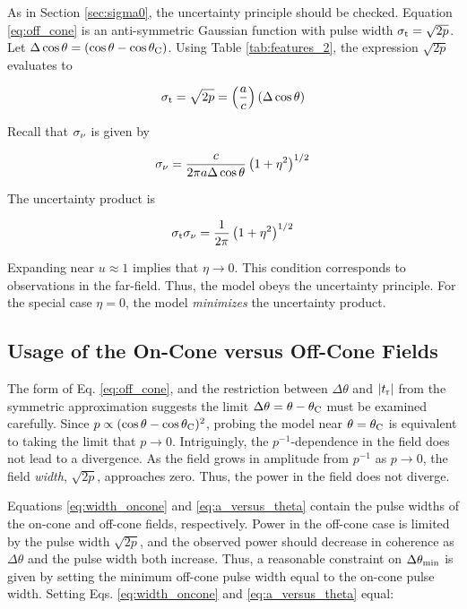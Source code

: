 \documentclass[amsmath,amssymb,aps,prd,10pt,twocolumn]{revtex4}
\begin{document}
As in Section \ref{sec:sigma0}, the uncertainty principle should be checked.  Equation \ref{eq:off_cone} is an anti-symmetric Gaussian function with pulse width $\sigma_{\rm t} = \sqrt{2p}$.  Let $\Delta\cos\theta = (\cos\theta - \cos\theta_{\rm C})$.  Using Table \ref{tab:features_2}, the expression $\sqrt{2p}$ evaluates to

\begin{equation}
\sigma_{\rm t} = \sqrt{2p} = \left(\frac{a}{c}\right)(\Delta \cos\theta) \label{eq:a_versus_theta}
\end{equation}

Recall that $\sigma_{\rm \nu}$ is given by

\begin{equation}
\sigma_{\rm \nu} = \frac{c}{2\pi a \Delta\cos\theta}\left(1+\eta^2\right)^{1/2} \label{eq:sigmanu3}
\end{equation}

The uncertainty product is

\begin{equation}
\sigma_{\rm t} \sigma_{\rm \nu} = \frac{1}{2 \pi} \left(1+\eta^2\right)^{1/2} \label{eq:sigma_result}
\end{equation}

Expanding near $u \approx 1$ implies that $\eta \to 0$.  This condition corresponds to observations in the far-field.  Thus, the model obeys the uncertainty principle.  For the special case $\eta = 0$, the model \textit{minimizes} the uncertainty product.

\subsection{Usage of the On-Cone versus Off-Cone Fields}
\label{sec:usage}

The form of Eq. \ref{eq:off_cone}, and the restriction between $\Delta\theta$ and $|t_{\rm r}|$ from the symmetric approximation suggests the limit $\Delta\theta = \theta-\theta_{\rm C}$ must be examined carefully.  Since $p \propto (\cos\theta - \cos\theta_{\rm C})^2$, probing the model near $\theta = \theta_{\rm C}$ is equivalent to taking the limit that $p \to 0$.  Intriguingly, the $p^{-1}$-dependence in the field does not lead to a divergence.  As the field grows in amplitude from $p^{-1}$ as $p \to 0$, the field \textit{width}, $\sqrt{2p}$, approaches zero.  Thus, the power in the field does not diverge.  

Equations \ref{eq:width_oncone} and \ref{eq:a_versus_theta} contain the pulse widths of the on-cone and off-cone fields, respectively.  Power in the off-cone case is limited by the pulse width $\sqrt{2p}$, and the observed power should decrease in coherence as $\Delta\theta$ and the pulse width both increase.  Thus, a reasonable constraint on $\Delta\theta_{\rm min}$ is given by setting the minimum off-cone pulse width equal to the on-cone pulse width.  Setting Eqs. \ref{eq:width_oncone} and \ref{eq:a_versus_theta} equal:
\end{document}
